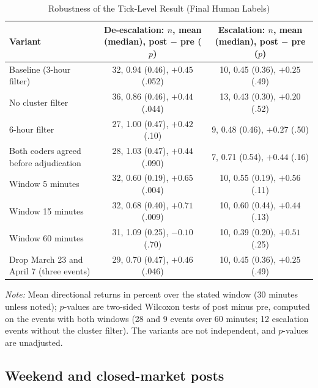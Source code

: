 \documentclass[11pt]{article}
\begin{document}
\begin{table}[h]
\centering
\small
\caption{Robustness of the Tick-Level Result (Final Human Labels)}
\label{tab:robust}
\begin{tabular}{lcc}
\toprule
Variant & De-escalation: $n$, mean (median), post $-$ pre ($p$) & Escalation: $n$, mean (median), post $-$ pre ($p$) \\
\midrule
Baseline (3-hour filter) & 32, 0.94 (0.46), $+0.45$ (.052) & 10, 0.45 (0.36), $+0.25$ (.49) \\
No cluster filter & 36, 0.86 (0.46), $+0.44$ (.044) & 13, 0.43 (0.30), $+0.20$ (.52) \\
6-hour filter & 27, 1.00 (0.47), $+0.42$ (.10) & 9, 0.48 (0.46), $+0.27$ (.50) \\
Both coders agreed before adjudication & 28, 1.03 (0.47), $+0.44$ (.090) & 7, 0.71 (0.54), $+0.44$ (.16) \\
Window 5 minutes & 32, 0.60 (0.19), $+0.65$ (.004) & 10, 0.55 (0.19), $+0.56$ (.11) \\
Window 15 minutes & 32, 0.68 (0.40), $+0.71$ (.009) & 10, 0.60 (0.44), $+0.44$ (.13) \\
Window 60 minutes & 31, 1.09 (0.25), $-0.10$ (.70) & 10, 0.39 (0.20), $+0.51$ (.25) \\
Drop March 23 and April 7 (three events) & 29, 0.70 (0.47), $+0.46$ (.046) & 10, 0.45 (0.36), $+0.25$ (.49) \\
\bottomrule
\end{tabular}

\vspace{0.5em}
\begin{minipage}{0.95\textwidth}
\footnotesize\textit{Note:} Mean directional returns in percent over the stated window (30 minutes unless noted); $p$-values are two-sided Wilcoxon tests of post minus pre, computed on the events with both windows (28 and 9 events over 60 minutes; 12 escalation events without the cluster filter). The variants are not independent, and $p$-values are unadjusted.
\end{minipage}
\end{table}

\subsection{Weekend and closed-market posts}
\end{document}
